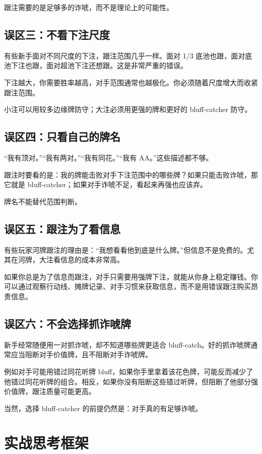 跟注需要的是足够多的诈唬，而不是理论上的可能性。

\subsection{误区三：不看下注尺度}

有些新手面对不同尺度的下注，跟注范围几乎一样。面对 1/3 底池也跟，面对底池下注也跟，面对超池下注还想跟。这是非常严重的错误。

下注越大，你需要胜率越高，对手范围通常也越极化。你必须随着尺度增大而收紧跟注范围。

小注可以用较多边缘牌防守；大注必须用更强的牌和更好的 bluff-catcher 防守。

\subsection{误区四：只看自己的牌名}

“我有顶对。”“我有两对。”“我有同花。”“我有 AA。”这些描述都不够。

跟注时要看的是：我的牌能击败对手下注范围中的哪些牌？如果只能击败诈唬，那它就是 bluff-catcher；如果对手诈唬不足，看起来再强也应该弃。

牌名不能替代范围判断。

\subsection{误区五：跟注为了看信息}

有些玩家河牌跟注的理由是：“我想看看他到底是什么牌。”但信息不是免费的。尤其在河牌，大注看信息的成本非常高。

如果你总是为了信息而跟注，对手只需要用强牌下注，就能从你身上稳定赚钱。你可以通过观察行动线、摊牌记录、对手习惯来获取信息，而不是用错误跟注购买昂贵信息。

\subsection{误区六：不会选择抓诈唬牌}

新手经常随便用一对抓诈唬，却不知道哪些牌更适合 bluff-catch。好的抓诈唬牌通常应当阻断对手价值牌，且不阻断对手诈唬牌。

例如对手可能用错过同花听牌 bluff，如果你手里拿着该花色牌，可能反而减少了他错过同花听牌的组合。相反，如果你没有阻断这些错过听牌，但阻断了他部分强价值牌，跟注质量可能更高。

当然，选择 bluff-catcher 的前提仍然是：对手真的有足够诈唬。

\section{实战思考框架}

